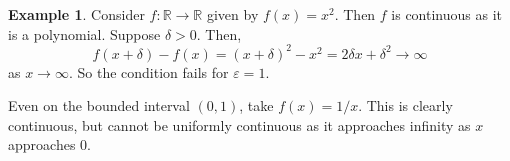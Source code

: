 \documentclass[12pt]{article}
\theoremstyle{definition}
\newtheorem{example}{Example}[section]
\theoremstyle{remark}
\begin{document}
\begin{adjustbox}{minipage = \columnwidth - 25.5pt, margin=1em, frame=1pt, margin=0em}
\begin{example}
	Consider $f : \mathbb{R} \to \mathbb{R}$ given by $f(x) = x^2$. Then $f$ is continuous as it is a polynomial. Suppose $\delta > 0$. Then,
	\[
		f(x + \delta) - f(x) = (x + \delta)^2 - x^2 = 2 \delta x + \delta^2 \to \infty
	\]
	as $x \to \infty$. So the condition fails for $\varepsilon = 1$.

	Even on the bounded interval $(0, 1)$, take $f(x) = 1/x$. This is clearly continuous, but cannot be uniformly continuous as it approaches infinity as $x$ approaches 0.
\end{example}

\end{adjustbox}



\newpage

\printindex
\end{document}
